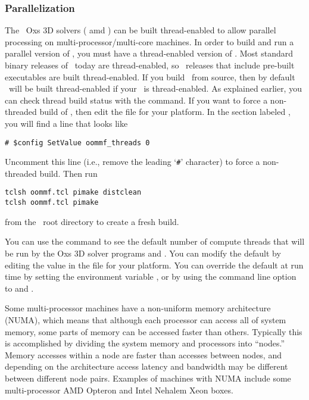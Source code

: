 \subsubsection{Parallelization}%
\label{sec:parallel}
The \OOMMF\ Oxs 3D solvers ( amd ) can be built
thread-enabled to allow parallel processing on
multi-processor/multi-core machines.  In order to build and run a
parallel version of \OOMMF, you must have a thread-enabled version of
\Tcl.  Most standard binary releases of \Tcl\ today are thread-enabled,
so \OOMMF\ releases that include pre-built executables are built
thread-enabled.  If you build \OOMMF\ from source, then by default
\OOMMF\ will be built thread-enabled if your \Tcl\ is thread-enabled.
As explained earlier, you can check thread build status with the
 command.  If you want to force a
non-threaded build of \OOMMF, then edit the  file
for your platform.  In the section labeled , you
will find a line that looks like
\begin{verbatim}
# $config SetValue oommf_threads 0
\end{verbatim}
Uncomment this line (i.e., remove the leading `\verb+#+' character) to
force a non-threaded build.  Then run
\begin{verbatim}
tclsh oommf.tcl pimake distclean
tclsh oommf.tcl pimake
\end{verbatim}
from the \OOMMF\ root directory to create a fresh build.

You can use the  command to see the
default number of compute threads that will be run by the Oxs 3D solver
programs  and .  You can modify the default by
editing the  value in the
 file for your platform.  You can override the
default at run time by setting the environment variable
, or by
using the command line option  to  and
.

Some multi-processor machines have a non-uniform memory
architecture (NUMA), which means that although each processor can access
all of system memory, some parts of memory can be accessed faster than
others.  Typically this is accomplished by dividing the system memory
and processors into ``nodes.''  Memory accesses within a node are faster
than accesses between nodes, and depending on the architecture access
latency and bandwidth may be different between different node pairs.
Examples of machines with NUMA include some multi-processor AMD Opteron
and Intel Nehalem Xeon boxes.


